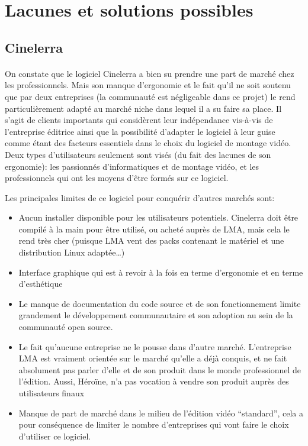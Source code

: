 \newpage \section{Lacunes et solutions possibles}

\subsection {Cinelerra}

\paragraph{}

On constate que le logiciel Cinelerra a bien su prendre une part de
marché chez les professionnels. Mais son manque d'ergonomie et le
fait qu'il ne soit soutenu que par deux entreprises (la communauté est
négligeable dans ce projet) le rend particulièrement adapté au marché
niche dans lequel il a su faire sa place. Il s'agit de clients importants
qui considèrent leur indépendance vis-à-vis de l'entreprise éditrice
ainsi que la possibilité d'adapter le logiciel à leur guise comme étant
des facteurs essentiels dans le choix du logiciel de montage vidéo. Deux
types d'utilisateurs seulement sont visés (du fait des lacunes de
son ergonomie): les passionnés d'informatiques et de montage vidéo,
et les professionnels qui ont les moyens d'être formés sur ce logiciel.

Les principales limites de ce logiciel pour conquérir d'autres marchés
sont:

\begin{itemize}

  \item {Aucun installer disponible pour les utilisateurs
  potentiels. Cinelerra doit être
    compilé à la main pour être utilisé, ou acheté auprès de LMA,
    mais cela le rend très cher (puisque LMA vent des packs contenant
    le matériel et une distribution Linux adaptée\ldots)}

  \item {Interface graphique qui est à revoir à la fois en terme
    d'ergonomie et en terme d'esthétique}

  \item {Le manque de documentation du code source et de son
  fonctionnement
    limite grandement le développement communautaire et son adoption
    au sein de la communauté open source.}

  \item {Le fait qu'aucune entreprise ne le pousse dans d'autre marché.
    L'entreprise LMA est vraiment orientée sur le marché qu'elle a
    déjà conquis, et ne fait absolument pas parler d'elle et de son
    produit dans le monde professionnel de l'édition. Aussi, Héroïne,
    n'a pas vocation à vendre son produit auprès des utilisateurs
    finaux}

  \item {Manque de part de marché dans le milieu de l'édition vidéo
    ``standard'', cela a pour conséquence de limiter le nombre
    d'entreprises qui vont faire le choix d'utiliser ce logiciel.}

\end{itemize}

